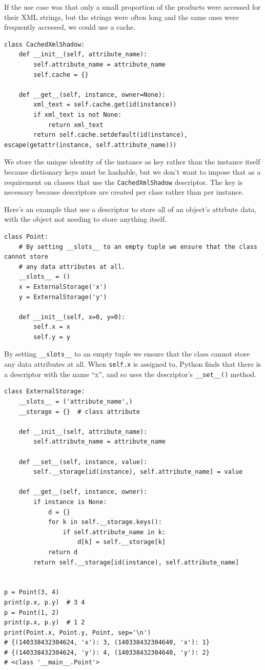 If the use case was that only a small proportion of the products were accessed for their XML strings, but the strings were often long and the same ones were frequently accessed, we could use a cache.
\begin{lstlisting}
class CachedXmlShadow:
    def __init__(self, attribute_name):
        self.attribute_name = attribute_name
        self.cache = {}

    def __get__(self, instance, owner=None):
        xml_text = self.cache.get(id(instance))
        if xml_text is not None:
            return xml_text
        return self.cache.setdefault(id(instance), escape(getattr(instance, self.attribute_name)))
\end{lstlisting}

We store the unique identity of the instance as key rather than the instance itself because dictionary keys must be hashable, but we don't want to impose that as a requirement on classes that use the \verb|CachedXmlShadow| descriptor.
The key is necessary because descriptors are created per class rather than per instance.



Here's an example that use a descriptor to store all of an object's attrbute data, with the object not needing to store anything itself.

\begin{lstlisting}
class Point:
    # By setting __slots__ to an empty tuple we ensure that the class cannot store
    # any data attributes at all.
    __slots__ = ()
    x = ExternalStorage('x')
    y = ExternalStorage('y')

    def __init__(self, x=0, y=0):
        self.x = x
        self.y = y  
\end{lstlisting}

By setting \verb|__slots__| to an empty tuple we ensure that the class cannot store any data attributes at all.
When \verb|self.x| is assigned to, Python finds that there is a descriptor with the name ``x'', and so uses the descriptor's \verb|__set__()| method.


\begin{lstlisting}
class ExternalStorage:
    __slots__ = ('attribute_name',)
    __storage = {}  # class attribute

    def __init__(self, attribute_name):
        self.attribute_name = attribute_name

    def __set__(self, instance, value):
        self.__storage[id(instance), self.attribute_name] = value

    def __get__(self, instance, owner):
        if instance is None:
            d = {}
            for k in self.__storage.keys():
                if self.attribute_name in k:
                    d[k] = self.__storage[k]
            return d
        return self.__storage[id(instance), self.attribute_name]


p = Point(3, 4)
print(p.x, p.y)  # 3 4
p = Point(1, 2)
print(p.x, p.y)  # 1 2
print(Point.x, Point.y, Point, sep='\n')
# {(140338432304624, 'x'): 3, (140338432304640, 'x'): 1}
# {(140338432304624, 'y'): 4, (140338432304640, 'y'): 2}
# <class '__main__.Point'>

\end{lstlisting}

